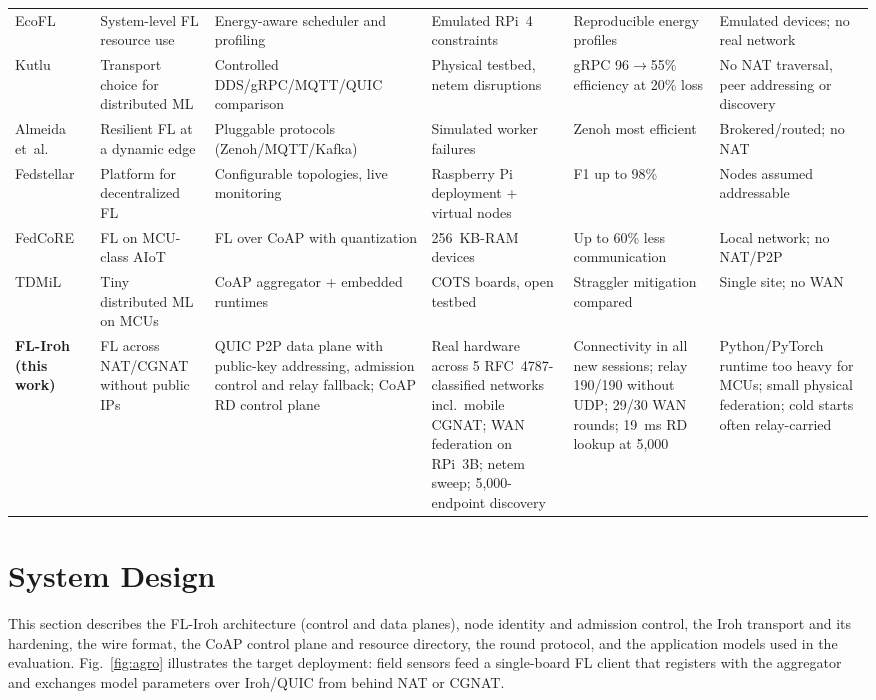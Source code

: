 \documentclass[a4paper,fleqn]{cas-dc}
\begin{document}
\begin{table}[!t]
\begin{tabular}{@{}p{1.75cm} p{2.6cm} p{3.0cm} p{2.9cm} p{2.6cm} p{3.6cm}@{}}
EcoFL~\cite{miller2026} & System-level FL resource use & Energy-aware scheduler and profiling & Emulated RPi~4 constraints & Reproducible energy profiles & Emulated devices; no real network \\
Kutlu~\cite{kutlu2026} & Transport choice for distributed ML & Controlled DDS/gRPC/MQTT/QUIC comparison & Physical testbed, netem disruptions & gRPC 96$\to$55\% efficiency at 20\% loss & No NAT traversal, peer addressing or discovery \\
Almeida et~al.~\cite{almeida2025} & Resilient FL at a dynamic edge & Pluggable protocols (Zenoh/MQTT/Kafka) & Simulated worker failures & Zenoh most efficient & Brokered/routed; no NAT \\
Fedstellar~\cite{martinezbeltran2024} & Platform for decentralized FL & Configurable topologies, live monitoring & Raspberry Pi deployment + virtual nodes & F1 up to 98\% & Nodes assumed addressable \\
FedCoRE~\cite{djamaa2025} & FL on MCU-class AIoT & FL over CoAP with quantization & 256~KB-RAM devices & Up to 60\% less communication & Local network; no NAT/P2P \\
TDMiL~\cite{gulati2024} & Tiny distributed ML on MCUs & CoAP aggregator + embedded runtimes & COTS boards, open testbed & Straggler mitigation compared & Single site; no WAN \\
\midrule
\textbf{FL-Iroh (this work)} & FL across NAT/CGNAT without public IPs & QUIC P2P data plane with public-key addressing, admission control and relay fallback; CoAP RD control plane & Real hardware across 5 RFC~4787-classified networks incl.\ mobile CGNAT; WAN federation on RPi~3B; netem sweep; 5{,}000-endpoint discovery & Connectivity in all new sessions; relay 190/190 without UDP; 29/30 WAN rounds; 19~ms RD lookup at 5{,}000 & Python/PyTorch runtime too heavy for MCUs; small physical federation; cold starts often relay-carried \\
\bottomrule
\end{tabular}
\end{table}

\section{System Design}
\label{sec:system}

This section describes the FL-Iroh architecture (control and data planes), node identity and admission control, the Iroh transport and its hardening, the wire format, the CoAP control plane and resource directory, the round protocol, and the application models used in the evaluation. Fig.~\ref{fig:agro} illustrates the target deployment: field sensors feed a single-board FL client that registers with the aggregator and exchanges model parameters over Iroh/QUIC from behind NAT or CGNAT.
\end{document}

